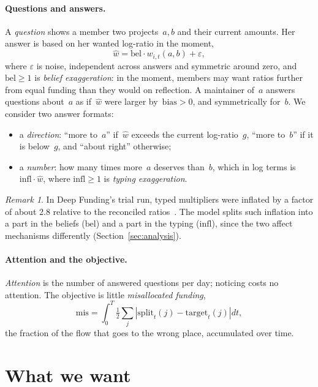 \documentclass[doubleblind]{ecai}
\theoremstyle{remark}
\newtheorem{remark}{Remark}
\newcommand{\Split}{\mathrm{split}}
\newcommand{\target}{\mathrm{target}}
\newcommand{\bel}{\mathrm{bel}}
\newcommand{\infl}{\mathrm{infl}}
\newcommand{\bias}{\mathrm{bias}}
\newcommand{\mis}{\mathrm{mis}}
\begin{document}
\paragraph{Questions and answers.}
A \emph{question} shows a member two projects~$a,b$ and their current amounts. Her answer is based on her wanted log-ratio in the moment,
\[
\hat w = \bel\cdot w_{i,t}(a,b) + \varepsilon ,
\]
where $\varepsilon$ is noise, independent across answers and symmetric around zero, and~$\bel \ge 1$ is \emph{belief exaggeration}: in the moment, members may want ratios further from equal funding than they would on reflection. A maintainer of~$a$ answers questions about~$a$ as if~$\hat w$ were larger by~$\bias > 0$, and symmetrically for~$b$. We consider two answer formats:
\begin{itemize}[leftmargin=*,nosep]
\item a \emph{direction}: ``more to~$a$'' if~$\hat w$ exceeds the current log-ratio~$g$, ``more to~$b$'' if it is below~$g$, and ``about right'' otherwise;
\item a \emph{number}: how many times more~$a$ deserves than~$b$, which in log terms is $\infl\cdot\hat w$, where $\infl \ge 1$ is \emph{typing exaggeration}.
\end{itemize}
\begin{remark}
In Deep Funding's trial run, typed multipliers were inflated by a factor of about 2.8 relative to the reconciled ratios~\cite{niemerg2026verdict}. The model splits such inflation into a part in the beliefs ($\bel$) and a part in the typing ($\infl$), since the two affect mechanisms differently (Section~\ref{sec:analysis}).
\end{remark}

\paragraph{Attention and the objective.}
\emph{Attention} is the number of answered questions per day; noticing costs no attention. The objective is little \emph{misallocated funding},
\[
\mis = \int_0^T \tfrac12 \textstyle\sum_{j} \left|\Split_t(j) - \target_t(j)\right| dt ,
\]
the fraction of the flow that goes to the wrong place, accumulated over time.

\section{What we want}\label{sec:want}
\end{document}
